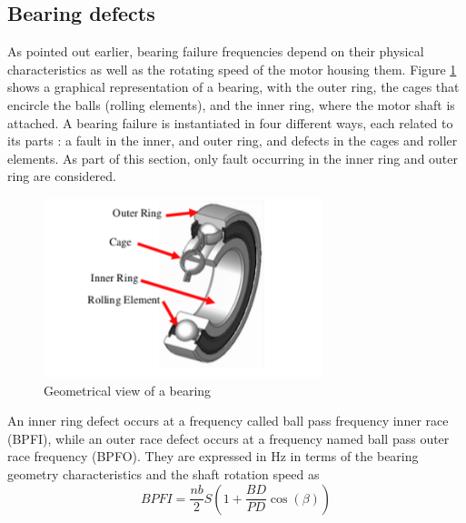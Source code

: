 \documentclass[../Main/thesis.tex]{subfiles}
\begin{document}


\subsection{Bearing defects}
\label{sec:fault}
As pointed out earlier, bearing failure frequencies depend on their physical characteristics as well as the rotating speed of the motor housing them. Figure \ref{fig:bearing} shows a graphical representation of a bearing, with the outer ring, the cages that encircle the balls (rolling elements), and the inner ring, where the motor shaft is attached. A bearing failure is instantiated in four different ways, each related to its parts : a fault in the inner, and outer ring, and defects in the cages and roller elements. As part of this section, only fault occurring in the inner ring and outer ring are considered.
\begin{figure}[H] %
   \centering
   \includegraphics[width=3.2in]{../fig/bearing}  
   \caption{Geometrical view of a bearing}
   \label{fig:bearing}
\end{figure}
\justify
 An inner ring defect occurs at a frequency called ball pass frequency inner race (BPFI), while an outer race defect occurs at a frequency named ball pass outer race frequency (BPFO). They are expressed in Hz in terms of the bearing geometry characteristics and the shaft rotation speed as 
\begin{equation}\label{eq:bpfi}
BPFI = \frac{nb}{2}S\left( 1 +  \frac{BD}{PD}\cos(\beta)  \right)
\end{equation}
\end{document}
